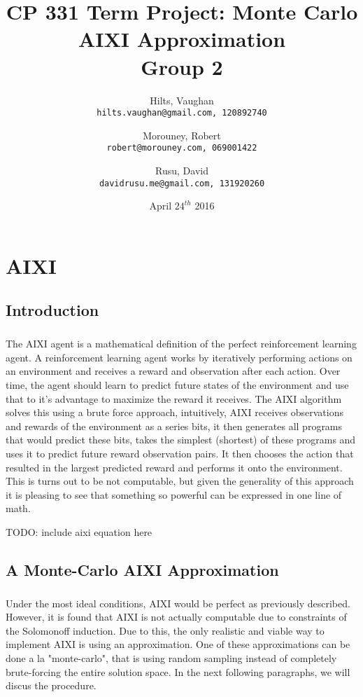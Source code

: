 \documentclass[fancychapters]{report}   	%
\title{CP 331 Term Project: Monte Carlo AIXI Approximation\\[5pt]
	Group 2}
\author{
  Hilts, Vaughan\\
  \texttt{hilts.vaughan@gmail.com, 120892740}
  \and
  Morouney, Robert\\
  \texttt{robert@morouney.com, 069001422}
  \and
  Rusu, David\\
  \texttt{davidrusu.me@gmail.com, 131920260}
}
\date{April $24^{th}$ 2016}
\begin{document}
\maketitle
\tableofcontents
\chapter{AIXI}


\section{Introduction}

\paragraph{}The AIXI agent is a mathematical definition of the perfect reinforcement learning agent. A reinforcement learning agent works by iteratively performing actions on an environment and receives a reward and observation after each action.  Over time, the agent should learn to predict future states of the environment and use that to it's advantage to maximize the reward it receives.  The AIXI algorithm solves this using a brute force approach, intuitively, AIXI receives observations and rewards of the environment as a series bits, it then generates all programs that would predict these bits, takes the simplest (shortest) of these programs and uses it to predict future reward observation pairs. It then chooses the action that resulted in the largest predicted reward and performs it onto the environment. This is turns out to be not computable, but given the generality of this approach it is pleasing to see that something so powerful can be expressed in one line of math.

TODO: include aixi equation here


\section{A Monte-Carlo AIXI Approximation}

\paragraph{}Under the most ideal conditions, AIXI would be perfect as previously described. However, it is found that AIXI is not actually computable due to constraints of the Solomonoff induction. Due to this, the only realistic and viable way to implement AIXI is using an approximation. One of these approximations can be done a la "monte-carlo", that is using random sampling instead of completely brute-forcing the entire solution space. In the next following paragraphs, we will discus the procedure.
\end{document}
